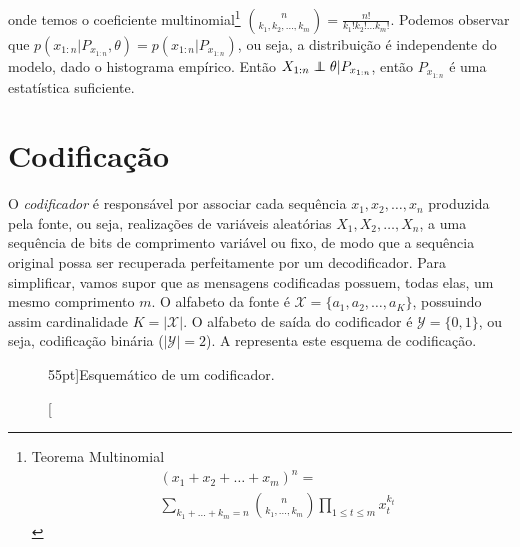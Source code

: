 onde temos o coeficiente multinomial\footnote{
  Teorema Multinomial
        \begin{align}
          &(x_1 + x_2 + \ldots + x_m)^n = \nonumber \\ &\sum_{k_1 + \ldots + k_m = n} {n \choose {k_1, \ldots, k_m}} \prod_{1 \leq t \leq m} x_t^{k_t}
        \end{align}
}
${n \choose {k_1, k_2, \ldots, k_m}} = \frac{n!}{k_1! k_2! \ldots k_m!}$.
Podemos observar que $p(x_{1:n}|P_{x_{1:n}},\theta) = p(x_{1:n}|P_{x_{1:n}})$, ou seja,
a distribuição é independente do modelo, dado o histograma empírico.
Então $X_{1:n} \independent \theta \vert P_{x_{1:n}}$, então $P_{x_{1:n}}$ é uma estatística suficiente.






\section{Codificação}

O \emph{codificador} é responsável por associar cada sequência $x_1,x_2,\ldots,x_n$
produzida pela fonte, ou seja, realizações de variáveis aleatórias $X_1,X_2,\ldots,X_n$,
a uma sequência de bits de comprimento variável ou fixo, de modo que a sequência original 
possa ser recuperada perfeitamente por um decodificador. Para simplificar, vamos
supor que as mensagens codificadas possuem, todas elas, um mesmo comprimento $m$.
O alfabeto da fonte é $\mathcal{X} = \{a_1, a_2, \ldots, a_K\}$, possuindo assim 
cardinalidade $K = \vert \mathcal{X} \vert$. O alfabeto
de saída do codificador é $\mathcal{Y} = \{0,1\}$, ou seja, codificação binária ($\vert \mathcal{Y} \vert = 2$).
A  representa este esquema de codificação.

\begin{figure}
\caption[][55pt]{Esquemático de um codificador.}
\label{fig:blockcoding}
\end{figure}

